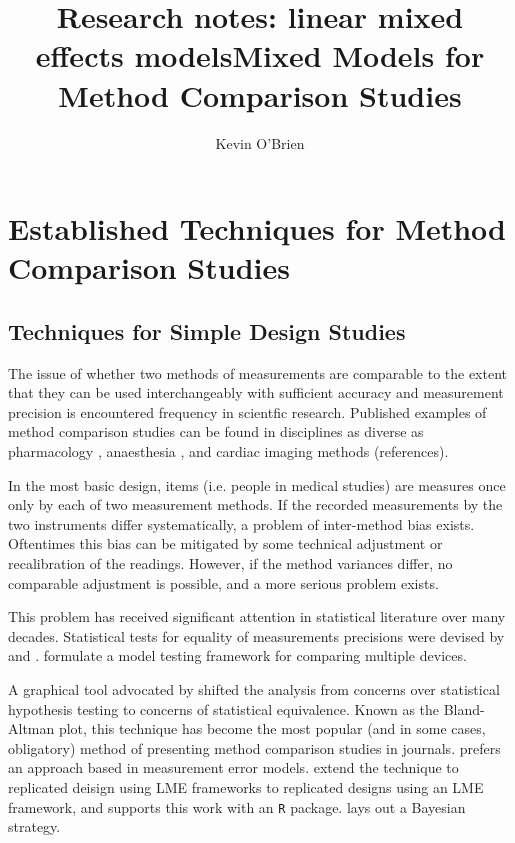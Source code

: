 \documentclass[12pt, a4paper]{report}
\title{Research notes: linear mixed effects models}
\author{ } \date{ }
\theoremstyle{plain}
\theoremstyle{definition}
\theoremstyle{remark}
\begin{document}
	\author{Kevin O'Brien}
	\title{Mixed Models for Method Comparison Studies}
	\tableofcontents
	
	\newpage
	
\chapter{Established Techniques for Method Comparison Studies}
\section{Techniques for Simple Design Studies}
The issue of whether two methods of measurements are 
comparable to the extent that they can be used 
interchangeably with sufficient accuracy and measurement precision is encountered frequency in scientfic research. Published examples of method comparison studies can be found in disciplines
as diverse as pharmacology \citep{ludbrook97}, anaesthesia \citep{Myles}, and cardiac imaging methods \citep{Krumm}(references).


In the most basic design, items (i.e. people in medical studies) are measures once only by each of two measurement methods. 
If the recorded measurements by the two instruments differ systematically, a problem of inter-method bias exists. Oftentimes this bias can be mitigated by some technical adjustment or recalibration of the readings. However, if the method variances differ, no comparable adjustment is possible, and a more serious problem exists.




This problem has received significant attention in statistical literature over many decades.
Statistical tests for equality of measurements precisions were devised by \citet{pitman} and \citet{morgan}. \citet{Grubbs48,Grubbs73} formulate a model testing framework for comparing multiple devices.




A graphical tool advocated by \citet{BA83,BA86} shifted the analysis from concerns over statistical hypothesis testing to concerns of statistical equivalence. Known as the Bland-Altman plot, this technique has become the most popular (and in some cases, obligatory) method of presenting method comparison studies in journals. \citet{DunnSEME} prefers an approach based in measurement error models. \citet{BXC2008} extend the technique to replicated deisign using LME frameworks to replicated designs using an LME framework, and supports this work with an \texttt{R} package. \citet{broemeling2009} lays out a Bayesian strategy.
\end{document}
